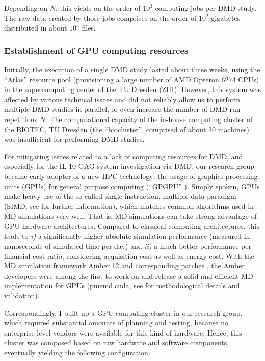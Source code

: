 Depending on $N$, this yields on the order of $10^3$ computing jobs per DMD
study. The raw data created by those jobs comprises on the order of $10^2$
gigabytes distributed in about $10^5$ files.


\subsubsection{Establishment of GPU computing resources}

Initially, the execution of a single DMD study lasted about three weeks, using
the \enquote{Atlas} resource pool (provisioning a large number of AMD Opteron
6274 CPUs) in the supercomputing center of the TU Dresden (ZIH). However, this
system was affected by various technical issues and did not reliably allow us to
perform multiple DMD studies in parallel, or even increase the number of DMD run
repetitions $N$. The computational capacity of the in-house computing cluster of
the BIOTEC, TU Dresden (the \enquote{biocluster}, comprised of about 30
machines) was insufficient for performing DMD studies.

For mitigating issues related to a lack of computing resources for DMD, and
especially for the IL-10-GAG system investigation via DMD, our research group
became early adopter of a new HPC technology: the usage of graphics processing
units (GPUs) for general purpose computing (\enquote{GPGPU}
\cite{wikipedia_gpgpu}). Simply spoken, GPUs make heavy use of the so-called
single instruction, multiple data paradigm (SIMD, see
\cite{kirk2012programming_gpus} for further information), which matches common
algorithms used in MD simulations very well. That is, MD simulations can take
strong advantage of GPU hardware architectures. Compared to classical computing
architectures, this leads to \textit{i)} a significantly higher absolute
simulation performance (measured in nanoseconds of simulated time per day) and
\textit{ii)} a much better performance per financial cost ratio, considering
acquisition cost as well as energy cost. With the MD simulation framework Amber
12 \cite{case_amber_12} and corresponding patches
\cite{amber_12_patches}, the Amber developers were among the first to work on
and release a solid and efficient MD implementation for GPUs (pmemd.cuda, see
\cite{amber_gpu_2012,amber_gpu_pme_2013} for methodological details and
validation).

Correspondingly, I built up a GPU computing cluster in our research group, which
required substantial amounts of planning and testing, because no
enterprise-level vendors were available for this kind of hardware. Hence, this
cluster was composed based on raw hardware and software components, eventually
yielding the following configuration:

